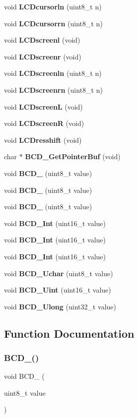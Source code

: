 \begin{DoxyCompactItemize}
void \textbf{ L\+C\+Dcursorln} (uint8\+\_\+t n)
\item 
void \textbf{ L\+C\+Dcursorrn} (uint8\+\_\+t n)
\item 
void \textbf{ L\+C\+Dscreenl} (void)
\item 
void \textbf{ L\+C\+Dscreenr} (void)
\item 
void \textbf{ L\+C\+Dscreenln} (uint8\+\_\+t n)
\item 
void \textbf{ L\+C\+Dscreenrn} (uint8\+\_\+t n)
\item 
void \textbf{ L\+C\+DscreenL} (void)
\item 
void \textbf{ L\+C\+DscreenR} (void)
\item 
void \textbf{ L\+C\+Dresshift} (void)
\item 
char $\ast$ \textbf{ B\+C\+D\+\_\+\+Get\+Pointer\+Buf} (void)
\item 
void \textbf{ B\+C\+D\+\_} (uint8\+\_\+t value)
\item 
void \textbf{ B\+C\+D\+\_} (uint8\+\_\+t value)
\item 
void \textbf{ B\+C\+D\+\_} (uint8\+\_\+t value)
\item 
void \textbf{ B\+C\+D\+\_\+Int} (uint16\+\_\+t value)
\item 
void \textbf{ B\+C\+D\+\_\+Int} (uint16\+\_\+t value)
\item 
void \textbf{ B\+C\+D\+\_\+Int} (uint16\+\_\+t value)
\item 
void \textbf{ B\+C\+D\+\_\+\+Uchar} (uint8\+\_\+t value)
\item 
void \textbf{ B\+C\+D\+\_\+\+Uint} (uint16\+\_\+t value)
\item 
void \textbf{ B\+C\+D\+\_\+\+Ulong} (uint32\+\_\+t value)
\end{DoxyCompactItemize}


\subsection{Function Documentation}
\mbox{\label{lcd_8c_a96dad2021433be8a2a64085cfa4132b0}} 
\subsubsection{B\+C\+D\+\_()}
{\footnotesize\ttfamily void B\+C\+D\+\_ (\begin{DoxyParamCaption}\item[{uint8\+\_\+t}]{value }\end{DoxyParamCaption})}

